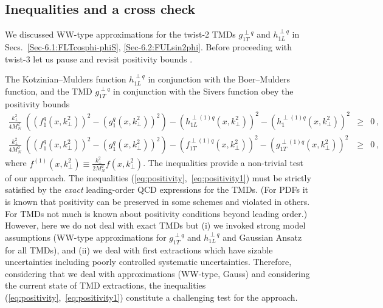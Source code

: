 \documentclass[a4paper,11pt]{article}
\newcommand{\ba}{\begin{eqnarray}}
\newcommand{\ea}{\end{eqnarray}}
\def\kperp{k_\perp}
\begin{document}
\subsection{Inequalities and a cross check}

We discussed WW-type approximations for the twist-2 TMDs
$g^{\perp q}_{1T}$ and $h^{\perp q}_{1L}$ 
in Secs.~\ref{Sec-6.1:FLTcosphi-phiS}, \ref{Sec-6.2:FULsin2phi}.
Before proceeding with twist-3 let us pause and revisit positivity 
bounds \cite{Bacchetta:1999kz}. %

The Kotzinian--Mulders function $h^{\perp q}_{1L}$ in conjunction with 
the Boer--Mulders function, and the TMD $g^{\perp q}_{1T}$ in conjunction 
with the Sivers function obey the positivity bounds 
\cite{Bacchetta:1999kz}
\begin{subequations}\ba
	\frac{\kperp^2}{4M_N^2}\;
	\left((f_{1}^{q}(x,\kperp^2))^2 -(g_{1}^{q}(x,\kperp^2))^2\right)
	- (h^{\perp(1)q}_{1L}(x,\kperp^2))^2 
	- (h_{1}^{\perp(1)q}(x,\kperp^2))^2
	& \ge & 0\,, \quad \label{eq:positivity}\\
	\frac{\kperp^2}{4M_N^2}\;
	\left((f_{1}^{q}(x,\kperp^2))^2 -(g_{1}^{q}(x,\kperp^2))^2\right)
	- (f_{1T}^{\perp(1)q}(x,\kperp^2))^2
	- (g^{\perp(1)q}_{1T}(x,\kperp^2))^2 
	& \ge & 0\,, \quad \label{eq:positivity1}
\ea\end{subequations}
where $f^{(1)}(x,\kperp^2) \equiv \frac{\kperp^2}{2M_N^2} f(x,\kperp^2)$.
The inequalities provide a non-trivial test of our approach.
The inequalities (\ref{eq:positivity},~\ref{eq:positivity1}) 
must be strictly satisfied by the {\it exact} leading-order QCD 
expressions for the TMDs.  
(For PDFs it is known that positivity can be preserved in some 
schemes and violated in others. For TMDs not much is 
known about positivity conditions beyond leading order.)
However, here we do not deal with exact TMDs but (i) we invoked 
strong model assumptions (WW-type approximations for $g^{\perp q}_{1T}$ 
and $h^{\perp q}_{1L}$ and Gaussian Ansatz for all TMDs), and (ii) we deal 
with first extractions which have sizable uncertainties including 
poorly controlled systematic uncertainties.
Therefore, considering that we deal with approximations 
(WW-type, Gauss) and considering the current state of TMD extractions, 
the inequalities (\ref{eq:positivity},~\ref{eq:positivity1}) constitute
a challenging test for the approach.
\end{document}
